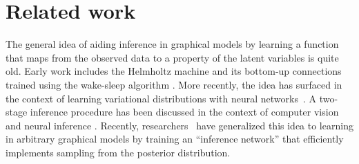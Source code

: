 \section{Related work}


The general idea of aiding inference in graphical models by
learning a function that maps from the observed data to
a property of the latent variables is quite old. Early work includes the
Helmholtz machine \citep{Dayan95} and its bottom-up connections trained using the wake-sleep
algorithm \citep{HintonEtAl1995}.
More recently, the idea has surfaced in the context of learning variational distributions with neural networks~\citep{WellingICML2014}.
A two-stage inference procedure has  been discussed in the context of
computer vision \citep{YuilleKersten2006} and neural inference \citep{KoernerEtAl1999}.
Recently, researchers~\citep{MnihGregor2014} %
have generalized this idea to learning in arbitrary graphical models by training
an ``inference network'' that efficiently implements sampling from the posterior
distribution.


